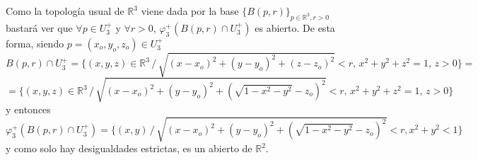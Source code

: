 \begin{ejer}
\begin{sol}
        Como la topolog\'ia usual de $\mathbb R^3$ viene dada por la base $\{B(p,r)\}_{p \in \mathbb R^3, r>0}$ bastar\'a ver que $\forall p \in U_3^+$ y $\forall r>0$, $\varphi_3^{+}(B(p,r) \cap U_3^{+})$ es abierto. De esta forma, siendo $p=(x_o, y_o, z_o) \in U_3^+$
        $$B(p,r) \cap U_3^+ = \{(x,y,z) \in \mathbb R^3 \, / \, \sqrt{(x-x_o)^2 + (y-y_o)^2 + (z-z_o)^2} < r, \, x^2 + y^2 +z^2=1, \, z> 0\} =$$ $$=\{(x,y,z) \in \mathbb R^3 \, / \, \sqrt{(x-x_o)^2 + (y-y_o)^2 +  (\sqrt{1-x^2-y^2}-z_o)^2} < r, \, x^2 + y^2 +z^2=1, \, z> 0\} $$
        y entonces
        $$\varphi_3^{+}(B(p,r) \cap U_3^{+}) = \{(x,y) \, / \,\sqrt{(x-x_o)^2 + (y-y_o)^2 +  (\sqrt{1-x^2-y^2}-z_o)^2} < r, x^2 + y^2 < 1\}$$
        y como solo hay desigualdades estrictas, es un abierto de $\mathbb R^2$.  

    \end{sol}
\end{ejer}
